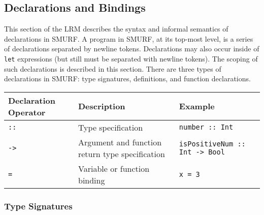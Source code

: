 %
%
\subsection{Declarations and Bindings}
\label{sec:declarations}
\setlength{\grammarindent}{4em}

This section of the LRM describes the syntax and informal semantics of
declarations in SMURF. A program in SMURF, at its top-most level, is a series of declarations
separated by newline tokens.
Declarations may also occur inside of
\texttt{let} expressions (but still must be separated with newline tokens).
The scoping of such declarations is described 
in this section. There are three types of declarations in SMURF: 
type signatures, definitions, and function declarations.

\begin{table} [H]
\centering
\begin{tabularx}{\textwidth}{lXl}
\hline\hline
Declaration Operator & Description & Example \\
\hline\hline
   \texttt{::} & Type specification & \texttt{number :: Int} \\ \hline
   \texttt{->} & Argument and function return type specification
     & \texttt{isPositiveNum :: Int -> Bool}  \\ \hline
	 \texttt{=} & Variable or function binding & \texttt {x = 3} \\ \hline
\end{tabularx}
\end{table}

\subsubsection{Type Signatures}
\label{sec:typesig}

